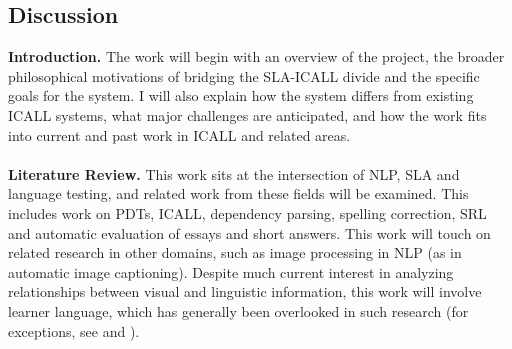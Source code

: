 \subsection{Discussion}
\label{discussion}
\textbf{Introduction.} The work will begin with an overview of the project, the broader philosophical motivations of bridging the SLA-ICALL divide and the specific goals for the system. I will also explain how the system differs from existing ICALL systems, what major challenges are anticipated, and how the work fits into current and past work in ICALL and related areas.\\
\\
\textbf{Literature Review.} This work sits at the intersection of NLP, SLA and language testing, and related work from these fields will be examined. This includes work on PDTs, ICALL, dependency parsing, spelling correction, SRL and automatic evaluation of essays and short answers. This work will touch on related research in other domains, such as image processing in NLP (as in automatic image captioning). Despite much current interest in analyzing relationships between visual and linguistic information, this work will involve learner language, which has generally been overlooked in such research (for exceptions, see \cite{somasundaran:chodorow:14} and \cite{somasundaran:ea:15}). 

